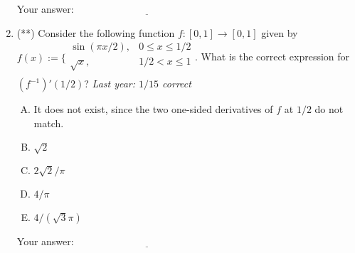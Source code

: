 \documentclass[10pt]{amsart}
\begin{document}
\begin{enumerate}
  \vspace{0.1in}
  Your answer: $\underline{\qquad\qquad\qquad\qquad\qquad\qquad\qquad}$
  \vspace{0.6in}

\item (**) Consider the following function $f:[0,1] \to [0,1]$ given
  by
  $f(x) := \lbrace\begin{array}{rl} \sin(\pi x/2), & 0 \le x \le 1/2 \\
    \sqrt{x}, & 1/2 < x \le 1\\\end{array}$. What is the correct
  expression for $(f^{-1})'(1/2)$? {\em Last year: $1/15$ correct}

  \begin{enumerate}[(A)]
  \item It does not exist, since the two one-sided derivatives of $f$ at
    $1/2$ do not match.
  \item $\sqrt{2}$
  \item $2\sqrt{2}/\pi$
  \item $4/\pi$
  \item $4/(\sqrt{3}\pi)$
  \end{enumerate}

  \vspace{0.1in}
  Your answer: $\underline{\qquad\qquad\qquad\qquad\qquad\qquad\qquad}$
  \vspace{0.6in}

\end{enumerate}
\end{document}
